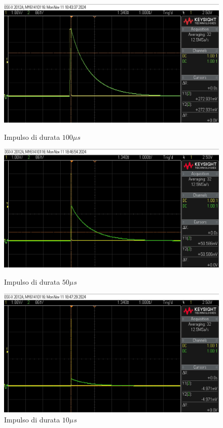 \begin{figure}
    \centering
    \begin{minipage}[t]{0.32\linewidth}
        \centering
        \includegraphics[width=\linewidth]{sessoesamba.jpg}
        \caption{Impulso di durata $100\mu s$}
    \end{minipage}%
    \hfill
    \begin{minipage}[t]{0.32\linewidth}
        \centering
        \includegraphics[width=\linewidth]{sessoesamba2.jpg}
        \caption{Impulso di durata $50\mu s$}
    \end{minipage}%
    \hfill
    \begin{minipage}[t]{0.32\linewidth}
        \centering
        \includegraphics[width=\linewidth]{sessoesamba3.jpg}
        \caption{Impulso di durata $10\mu s$}
    \end{minipage}
\end{figure}


